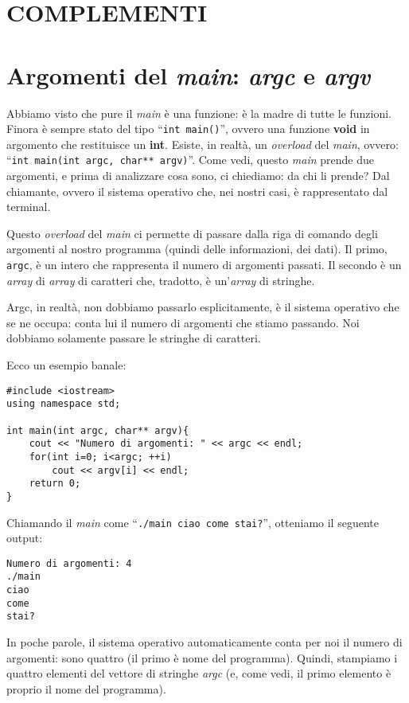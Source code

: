 \begin{subappendices}
\section*{COMPLEMENTI}
\section{Argomenti del \emph{main}: \emph{argc} e \emph{argv}}
Abbiamo visto che pure il \emph{main} è una funzione: è la madre di tutte le funzioni. Finora è sempre stato del tipo ``\lstinline|int main()|'', ovvero una funzione \textbf{void} in argomento che restituisce un \textbf{int}. Esiste, in realtà, un \emph{overload} del \emph{main}, ovvero: ``\lstinline|int main(int argc, char** argv)|''. Come vedi, questo \emph{main} prende due argomenti, e prima di analizzare cosa sono, ci chiediamo: da chi li prende? Dal chiamante, ovvero il sistema operativo che, nei nostri casi, è rappresentato dal terminal. 

Questo \emph{overload} del \emph{main} ci permette di passare dalla riga di comando degli argomenti al nostro programma (quindi delle informazioni, dei dati). Il primo, \verb|argc|, è un intero che rappresenta il numero di argomenti passati. Il secondo è un \emph{array} di \emph{array} di caratteri che, tradotto, è un'\emph{array} di stringhe.

Argc, in realtà, non dobbiamo passarlo esplicitamente, è il sistema operativo che se ne occupa: conta lui il numero di argomenti che stiamo passando. Noi dobbiamo solamente passare le stringhe di caratteri.

Ecco un esempio banale:
\begin{lstlisting}
#include <iostream>
using namespace std;

int main(int argc, char** argv){
	cout << "Numero di argomenti: " << argc << endl;
	for(int i=0; i<argc; ++i)
		cout << argv[i] << endl;
	return 0;
}
\end{lstlisting} 
Chiamando il \emph{main} come ``\verb|./main ciao come stai?|'', otteniamo il seguente output:
\begin{shaded}
\begin{verbatim}
Numero di argomenti: 4
./main
ciao
come
stai?
\end{verbatim}
\end{shaded}

In poche parole, il sistema operativo automaticamente conta per noi il numero di argomenti: sono quattro (il primo è nome del programma). Quindi, stampiamo i quattro elementi del vettore di stringhe \emph{argc} (e, come vedi, il primo elemento è proprio il nome del programma).\\


\end{subappendices}
